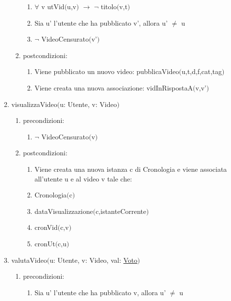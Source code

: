 \documentclass{article}
\begin{document}
\begin{enumerate}
\begin{enumerate}
\begin{enumerate}
            \begin{enumerate}
                \item $\forall$ v utVid$($u,v$)$ $\rightarrow$ $\neg$ titolo$($v,t$)$
                \item Sia u' l'utente che ha pubblicato v', allora u' $\neq$ u
                \item $\neg$ VideoCensurato$($v'$)$
            \end{enumerate}
            \item postcondizioni:
            \begin{enumerate}
                \item Viene pubblicato un nuovo video: pubblicaVideo$($u,t,d,f,cat,tag$)$
                \item Viene creata una nuova associazione: vidInRispostaA$($v,v'$)$
            \end{enumerate}
        \end{enumerate}
        \item visualizzaVideo$($u: Utente, v: Video$)$
        \begin{enumerate}
            \item precondizioni:
            \begin{enumerate}
                \item $\neg$ VideoCensurato$($v$)$
            \end{enumerate}
            \item postcondizioni:
            \begin{enumerate}
                \item Viene creata una nuova istanza c di Cronologia e viene associata all'utente u e al video v tale che:
                \item Cronologia$($c$)$
                \item dataVisualizzazione$($c,istanteCorrente$)$
                \item cronVid$($c,v$)$
                \item cronUt$($c,u$)$
            \end{enumerate}
        \end{enumerate}
        \item valutaVideo$($u: Utente, v: Video, val: \hyperref[sec:TipoVoto]{Voto}$)$
        \begin{enumerate}
            \item precondizioni:
            \begin{enumerate}
                \item Sia u' l'utente che ha pubblicato v, allora u' $\neq$ u

\end{enumerate}
\end{enumerate}
\end{enumerate}
\end{enumerate}
\end{document}
